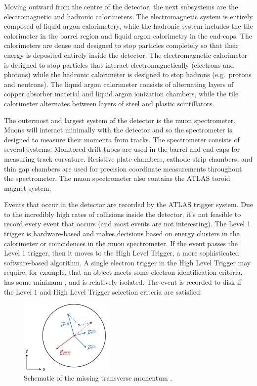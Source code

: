 Moving outward from the centre of the detector, the next subsystems are the electromagnetic and hadronic calorimeters. The electromagnetic system is entirely composed of liquid argon calorimetery, while the hadronic system includes the tile calorimeter in the barrel region and liquid argon calorimetry in the end-caps. The calorimeters are dense and designed to stop particles completely so that their energy is deposited entirely inside the detector. The electromagnetic calorimeter is designed to stop particles that interact electromagnetically (electrons and photons) while the hadronic calorimeter is designed to stop hadrons (e.g.\ protons and neutrons). The liquid argon calorimeter consists of alternating layers of copper absorber material and liquid argon ionization chambers, while the tile calorimeter alternates between layers of steel and plastic scintillators. 

The outermost and largest system of the detector is the muon spectrometer. Muons will interact minimally with the detector and so the spectrometer is designed to measure their momenta from tracks. The spectrometer consists of several systems. Monitored drift tubes are used in the barrel and end-caps for measuring track curvature. Resistive plate chambers, cathode strip chambers, and thin gap chambers are used for precision coordinate measurements throughout the spectrometer. The muon spectrometer also contains the ATLAS toroid magnet system.

Events that occur in the detector are recorded by the ATLAS trigger system. Due to the incredibly high rates of collisions inside the detector, it's not feasible to record every event that occurs (and most events are not interesting). The Level 1 trigger is hardware-based and makes decisions based on energy clusters in the calorimeter or coincidences in the muon spectrometer. If the event passes the Level 1 trigger, then it moves to the High Level Trigger, a more sophisticated software-based algorithm. A single electron trigger in the High Level Trigger may require, for example, that an object meets some electron identification criteria, has some minimum \pt, and is relatively isolated. The event is recorded to disk if the Level 1 and High Level Trigger selection criteria are satisfied.

\begin{figure}[!htb]
\centering
\includegraphics[width=0.4\textwidth]{Figures/etmiss.png}
\caption{Schematic of the missing transverse momentum \etmissvec.}
\label{fig:etmiss}
\end{figure}

